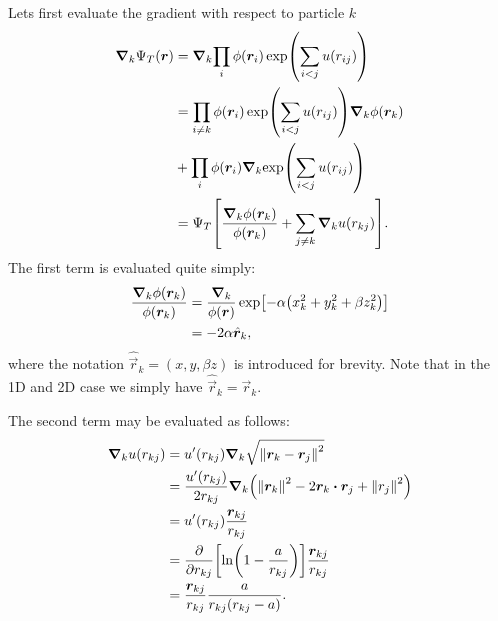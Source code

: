\documentclass[twocolumn]{article}
\begin{document}
Lets first evaluate the gradient with respect to particle $k$
\begin{align}
    \begin{split}
    \grad_k{\Psi_T(\bm r)}  
    &= \grad_k{\prod_i \phi(\bm r_i)\exp(\sum_{i<j}u(r_{ij}))}\\
    &= \prod_{i\neq k} \phi(\bm r_i)\exp(\sum_{i<j}u(r_{ij}))\grad_k{\phi(\bm
    r_k)}\\
    &+ \prod_{i} \phi(\bm r_i)\grad_k{\exp(\sum_{i<j}u(r_{ij}))}\\
    &= \Psi_T\qty[\frac{\grad_k \phi(\bm r_k)}{\phi(\bm r_k)} + \sum_{j\neq k}
    \grad_k u(r_{kj})].
    \end{split}\label{eq:grad-trail-wf}
\end{align}
The first term is evaluated quite simply:
\begin{align}
    \begin{split}
    \frac{\grad_k\phi(\bm r_k)}{\phi(\bm r_k)} &= \frac{\grad_k}{\phi(\bm r)}
    \exp[-\alpha\qty(x_k^2 + y_k^2 + \beta z_k^2)]\\
        &= -2\alpha\hat{\bm r}_k,
    \end{split}\label{eq:grad-phi_k-over-phi_k}
\end{align}
where the notation $\hat{\vec r}_k = (x, y,\beta z)$ is introduced for brevity.
Note that in the 1D and 2D case we simply have $\hat{\vec r}_k = \vec r_k$.


The second term may be evaluated as follows:
\begin{align}
    \begin{split}
    \grad_k u(r_{kj}) &= u'(r_{kj})\grad_k \sqrt{\norm{\vec r_k - \vec r_j}^2} \\
    &= \frac{u'(r_{kj})}{2r_{kj}}\grad_k\qty(\norm{\vec r_k}^2-2\vec r_k\vdot\vec
    r_j+\norm{r_j}^2)\\
    &= u'(r_{kj})\frac{\vec r_{kj}}{r_{kj}}\\
    &= \pdv{}{r_{kj}}\qty[ \ln(1 - \frac{a}{r_{kj}})] \frac{\vec
    r_{kj}}{r_{kj}}\\
    &= \frac{\vec r_{kj}}{r_{kj}}\frac{a}{r_{kj}(r_{kj}-a)}.
    \end{split}\label{eq:grad-u}
\end{align}
\end{document}
